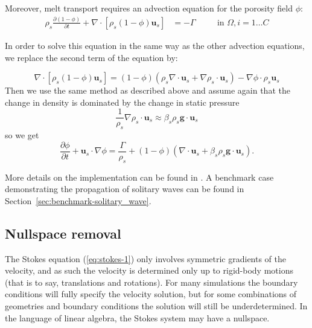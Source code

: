 \documentclass{article}
\begin{document}
Moreover, melt transport requires an advection equation for the porosity field $\phi$:
\begin{align}
  \label{eq:porosity}
  \rho_s \frac{\partial (1 - \phi)}{\partial t} + \nabla \cdot \left[ \rho_s (1 - \phi) \mathbf{u}_s \right]
  &=
  - \Gamma
  & \quad
  & \textrm{in $\Omega$},
  i=1\ldots C
\end{align}

In order to solve this equation in the same way as the other advection equations, we replace the second term of the equation by: 

\begin{equation*}
\nabla \cdot \left[ \rho_s (1 - \phi) \mathbf{u}_s \right]
= \left( 1-\phi \right) \left( \rho_s \nabla \cdot \mathbf{u}_s 
+ \nabla \rho_s \cdot \mathbf{u}_s \right)
- \nabla \phi \cdot \rho_s \mathbf{u}_s 
\end{equation*}
Then we use the same method as described above and assume again that the change in density is dominated by the change in static pressure
\begin{equation*}
\frac{1}{\rho_s} \nabla \rho_s \cdot \mathbf{u}_s 
\approx \beta_s \rho_s \textbf{g} \cdot \mathbf{u}_s 
\end{equation*}
so we get
\begin{equation*}
\frac{\partial \phi}{\partial t} + \mathbf{u}_s \cdot \nabla \phi
= \frac{\Gamma}{\rho_s}
+ (1 - \phi) (\nabla \cdot \mathbf{u}_s + \beta_s \rho_s \textbf{g} \cdot \mathbf{u}_s ).
\end{equation*}

More details on the implementation can be found in \cite{dannberg_melt}. A benchmark case demonstrating the propagation of solitary waves can be found in Section~\ref{sec:benchmark-solitary_wave}.

\subsection{Nullspace removal}

The Stokes equation (\ref{eq:stokes-1}) only involves symmetric gradients of the velocity, and as such 
the velocity is determined only up to rigid-body motions (that is to say, translations and rotations).
For many simulations the boundary conditions will fully specify the velocity solution, but for some 
combinations of geometries and boundary conditions the solution will still be underdetermined.
In the language of linear algebra, the Stokes system may have a nullspace.
\end{document}
